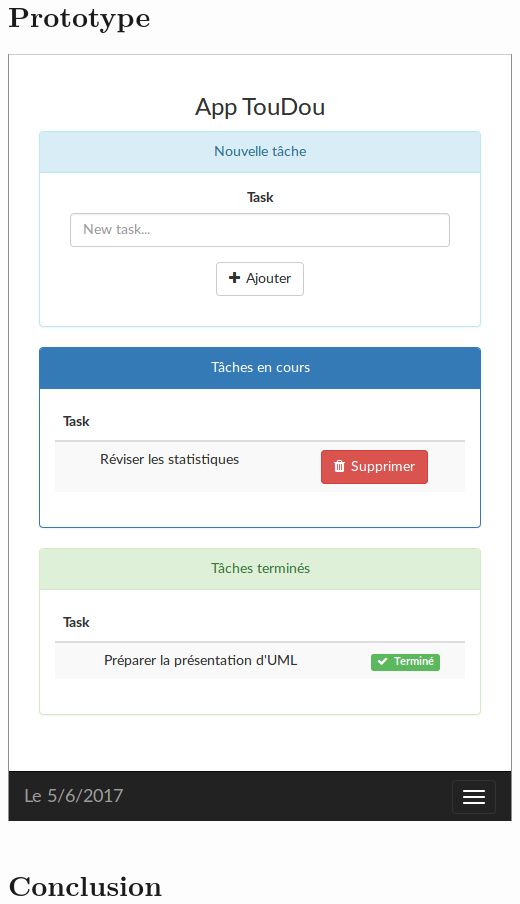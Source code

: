 \documentclass[french]{beamer}
\begin{document}
\section{Prototype}
\begin{frame}
  \begin{center}
  \begin{minipage}[c]{0.4\linewidth}%
   \includegraphics[width=1\linewidth]{prototype}  %
  \end{minipage}
\end{center}
\end{frame}

\section{Conclusion}
\begin{frame}

\end{frame}
\end{document}
